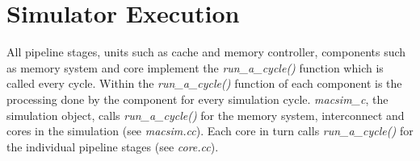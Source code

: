 \section{Simulator Execution}

All pipeline stages, units such as cache and memory controller, components such
as memory system and core implement the \textit{run\_a\_cycle()} function which
is called every cycle. Within the \textit{run\_a\_cycle()} function of each
component is the processing done by the component for every simulation cycle.
\textit{macsim\_c}, the simulation object, calls \textit{run\_a\_cycle()} for
the memory system, interconnect and cores in the simulation (see
    \textit{macsim.cc}). Each core in turn calls \textit{run\_a\_cycle()} for
the individual pipeline stages (see \textit{core.cc}).



